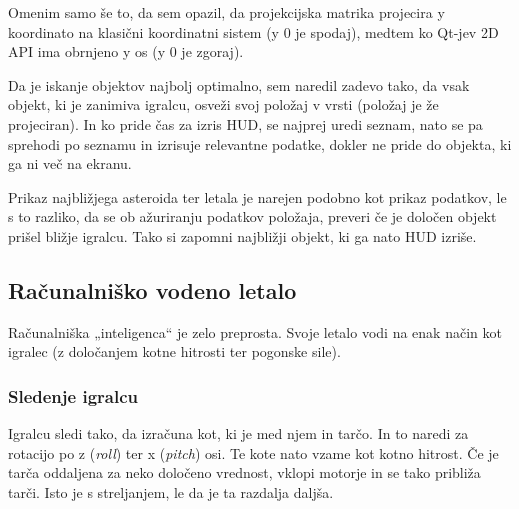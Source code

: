 \documentclass[a4paper]{article}
\begin{document}
Omenim samo še to, da sem opazil, da projekcijska matrika projecira y koordinato na klasični koordinatni sistem (y 0 je spodaj), medtem ko Qt-jev 2D API ima obrnjeno y os (y 0 je zgoraj).

Da je iskanje objektov najbolj optimalno, sem naredil zadevo tako, da vsak objekt, ki je zanimiva igralcu, osveži svoj položaj v vrsti (položaj je že projeciran). In ko pride čas za izris HUD, se najprej uredi seznam, nato se pa sprehodi po seznamu in izrisuje relevantne podatke, dokler ne pride do objekta, ki ga ni več na ekranu.

Prikaz najbližjega asteroida ter letala je narejen podobno kot prikaz podatkov, le s to razliko, da se ob ažuriranju podatkov položaja, preveri če je določen objekt prišel bližje igralcu. Tako si zapomni najbližji objekt, ki ga nato HUD izriše.

\subsection{Računalniško vodeno letalo}
Računalniška „inteligenca“ je zelo preprosta. Svoje letalo vodi na enak način kot igralec (z določanjem kotne hitrosti ter pogonske sile).

\subsubsection{Sledenje igralcu}
Igralcu sledi tako, da izračuna kot, ki je med njem in tarčo. In to naredi za rotacijo po z (\emph{roll}) ter x (\emph{pitch}) osi. Te kote nato vzame kot kotno hitrost. Če je tarča oddaljena za neko določeno vrednost, vklopi motorje in se tako približa tarči. Isto je s streljanjem, le da je ta razdalja daljša.
\end{document}
